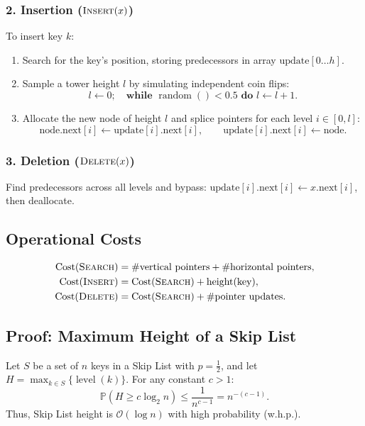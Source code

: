 \subsubsection{2. Insertion ($\textsc{Insert}(x)$)}
To insert key $k$:
\begin{enumerate}
  \item Search for the key's position, storing predecessors in array $\text{update}[0 \dots h]$.
  \item Sample a tower height $l$ by simulating independent coin flips:
  \begin{equation*}
    l \leftarrow 0; \quad \textbf{while } \operatorname{random}() < 0.5 \textbf{ do } l \leftarrow l + 1.
  \end{equation*}
  \item Allocate the new node of height $l$ and splice pointers for each level $i \in [0, l]$:
  \begin{equation}
    \text{node}.\text{next}[i] \leftarrow \text{update}[i].\text{next}[i], \qquad \text{update}[i].\text{next}[i] \leftarrow \text{node}.
  \end{equation}
\end{enumerate}

\subsubsection{3. Deletion ($\textsc{Delete}(x)$)}
Find predecessors across all levels and bypass: $\text{update}[i].\text{next}[i] \leftarrow x.\text{next}[i]$, then deallocate.

\subsection{Operational Costs}
\begin{align}
  \operatorname{Cost}(\textsc{Search}) &= \# \text{vertical pointers} + \# \text{horizontal pointers}, \\
  \operatorname{Cost}(\textsc{Insert}) &= \operatorname{Cost}(\textsc{Search}) + \operatorname{height}(\text{key}), \\
  \operatorname{Cost}(\textsc{Delete}) &= \operatorname{Cost}(\textsc{Search}) + \# \text{pointer updates}.
\end{align}

\subsection{Proof: Maximum Height of a Skip List}
\begin{theorem}
Let $S$ be a set of $n$ keys in a Skip List with $p = \frac{1}{2}$, and let $H = \max_{k \in S} \{\operatorname{level}(k)\}$. For any constant $c > 1$:
\begin{equation}
  \mathbb{P}(H \ge c \log_2 n) \le \frac{1}{n^{c-1}} = n^{-(c-1)}.
\end{equation}
Thus, Skip List height is $\mathcal{O}(\log n)$ with high probability (w.h.p.).
\end{theorem}

